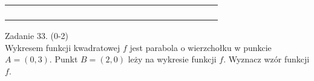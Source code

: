 \documentclass[10pt]{article}
\begin{document}
\begin{center}
\begin{tabular}{|c|c|c|c|c|c|c|c|c|c|c|c|c|c|c|c|c|c|c|c|c|c|}
\hline
 &  &  &  &  &  &  &  &  &  &  &  &  &  &  &  &  &  &  &  &  &  \\
\hline
 &  &  &  &  &  &  &  &  &  &  &  &  &  &  &  &  &  &  &  &  &  \\
\hline
 &  &  &  &  &  &  &  &  &  &  &  &  &  &  &  &  &  &  &  &  &  \\
\hline
 &  &  &  &  &  &  &  &  &  &  &  &  &  &  &  &  &  &  &  &  &  \\
\hline
 &  &  &  &  &  &  &  &  &  &  &  &  &  &  &  &  &  &  &  &  &  \\
\hline
\end{tabular}
\end{center}

Zadanie 33. (0-2)\\
Wykresem funkcji kwadratowej \(f\) jest parabola o wierzchołku w punkcie \(A=(0,3)\). Punkt \(B=(2,0)\) leży na wykresie funkcji \(f\). Wyznacz wzór funkcji \(f\).
\end{document}
